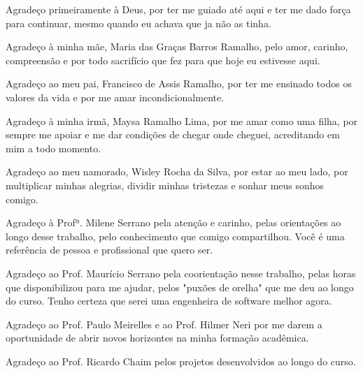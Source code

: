 \begin{agradecimentos}
Agradeço primeiramente à Deus, por ter me guiado até aqui e ter me dado força para continuar, mesmo quando eu achava que ja não as tinha.

Agradeço à minha mãe, Maria das Graças Barros Ramalho, pelo amor, carinho, compreensão e por todo sacrifício que fez para que hoje eu estivesse aqui.

Agradeço ao meu pai, Francisco de Assis Ramalho, por ter me ensinado todos os valores da vida e por me amar incondicionalmente.

Agradeço à minha irmã, Maysa Ramalho Lima, por me amar como uma filha, por sempre me apoiar e me dar condições de chegar onde cheguei, acreditando em mim a todo momento.   

Agradeço ao meu namorado, Wisley Rocha da Silva, por estar ao meu lado, por multiplicar minhas alegrias, dividir minhas tristezas e sonhar meus sonhos comigo. 

Agradeço à Profª. Milene Serrano pela atenção e carinho, pelas orientações ao longo desse trabalho, pelo conhecimento que comigo compartilhou. Você é uma referência de pessoa e profissional que quero ser.

Agradeço ao Prof. Maurício Serrano pela coorientação nesse trabalho, pelas horas que disponibilizou para me ajudar, pelos "puxões de orelha" que me deu ao longo do curso. Tenho certeza que serei uma engenheira de software melhor agora.

Agradeço ao Prof. Paulo Meirelles e ao Prof. Hilmer Neri por me darem a oportunidade de abrir novos horizontes na minha formação acadêmica.

Agradeço ao Prof. Ricardo Chaim pelos projetos desenvolvidos ao longo do curso. 
\end{agradecimentos}
